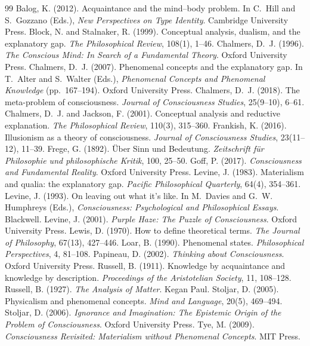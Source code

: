 \documentclass{situationist-preprint}
\begin{document}
\begin{thebibliography}{99}\small
{} Balog, K. (2012). Acquaintance and the mind--body problem. In C.~Hill and S.~Gozzano (Eds.), \emph{New Perspectives on Type Identity}. Cambridge University Press.
 Block, N. and Stalnaker, R. (1999). Conceptual analysis, dualism, and the explanatory gap. \emph{The Philosophical Review}, 108(1), 1--46.
 Chalmers, D.~J. (1996). \emph{The Conscious Mind: In Search of a Fundamental Theory}. Oxford University Press.
 Chalmers, D.~J. (2007). Phenomenal concepts and the explanatory gap. In T.~Alter and S.~Walter (Eds.), \emph{Phenomenal Concepts and Phenomenal Knowledge} (pp.~167--194). Oxford University Press.
 Chalmers, D.~J. (2018). The meta-problem of consciousness. \emph{Journal of Consciousness Studies}, 25(9--10), 6--61.
 Chalmers, D.~J. and Jackson, F. (2001). Conceptual analysis and reductive explanation. \emph{The Philosophical Review}, 110(3), 315--360.
 Frankish, K. (2016). Illusionism as a theory of consciousness. \emph{Journal of Consciousness Studies}, 23(11--12), 11--39.
 Frege, G. (1892). \"Uber Sinn und Bedeutung. \emph{Zeitschrift f\"ur Philosophie und philosophische Kritik}, 100, 25--50.
 Goff, P. (2017). \emph{Consciousness and Fundamental Reality}. Oxford University Press.
 Levine, J. (1983). Materialism and qualia: the explanatory gap. \emph{Pacific Philosophical Quarterly}, 64(4), 354--361.
 Levine, J. (1993). On leaving out what it's like. In M.~Davies and G.~W. Humphreys (Eds.), \emph{Consciousness: Psychological and Philosophical Essays}. Blackwell.
 Levine, J. (2001). \emph{Purple Haze: The Puzzle of Consciousness}. Oxford University Press.
 Lewis, D. (1970). How to define theoretical terms. \emph{The Journal of Philosophy}, 67(13), 427--446.
 Loar, B. (1990). Phenomenal states. \emph{Philosophical Perspectives}, 4, 81--108.
 Papineau, D. (2002). \emph{Thinking about Consciousness}. Oxford University Press.
 Russell, B. (1911). Knowledge by acquaintance and knowledge by description. \emph{Proceedings of the Aristotelian Society}, 11, 108--128.
 Russell, B. (1927). \emph{The Analysis of Matter}. Kegan Paul.
 Stoljar, D. (2005). Physicalism and phenomenal concepts. \emph{Mind and Language}, 20(5), 469--494.
 Stoljar, D. (2006). \emph{Ignorance and Imagination: The Epistemic Origin of the Problem of Consciousness}. Oxford University Press.
 Tye, M. (2009). \emph{Consciousness Revisited: Materialism without Phenomenal Concepts}. MIT Press.
\end{thebibliography}
\end{document}
